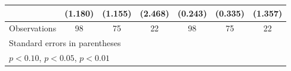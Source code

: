 {\begin{tabular}{l*{6}{c}}
                    &     (1.180)         &     (1.155)         &     (2.468)         &     (0.243)         &     (0.335)         &     (1.357)         \\
\hline
Observations        &          98         &          75         &          22         &          98         &          75         &          22         \\
\hline\hline
\multicolumn{7}{l}{\footnotesize Standard errors in parentheses}\\
\multicolumn{7}{l}{\footnotesize \sym{*} \(p<0.10\), \sym{**} \(p<0.05\), \sym{***} \(p<0.01\)}\\
\end{tabular}
}
